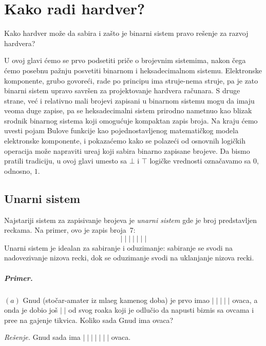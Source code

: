 \chapter{Kako radi hardver?}

Kako hardver mo\v ze da sabira i za\v sto je binarni sistem pravo re\v senje za razvoj hardvera?

U ovoj glavi \'cemo se prvo podsetiti pri\v ce o brojevnim sistemima,
nakon \v cega \'cemo posebnu pa\v znju posvetiti binarnom i heksadecimalnom sistemu.
Elektronske komponente, grubo govore\'ci, rade po principu ima struje-nema struje, pa je zato
binarni sistem upravo savr\v sen za projektovanje hardvera ra\v cunara.
S druge strane, ve\'c i relativno mali brojevi zapisani u binarnom sistemu mogu da imaju veoma duge
zapise, pa se heksadecimalni sistem prirodno nametnuo kao blizak srodnik binarnog sistema koji
omogu\'cuje kompaktan zapis broja. Na kraju \'cemo uvesti pojam Bulove funkcije kao pojednostavljenog
matemati\v ckog modela elektronske komponente, i pokaza\'cemo kako se polaze\'ci od osnovnih logi\v ckih
operacija mo\v ze napraviti ure\dj aj koji sabira binarno zapisane brojeve.
Da bismo pratili tradiciju, u ovoj glavi umesto sa $\bot$ i $\top$
logi\v cke vrednosti ozna\v cavamo sa $0$, odnosno, $1$.

\ifBIOINF
\section{Unarni sistem}

Najstariji sistem za zapisivanje brojeva je \emph{unarni sistem} gde je broj predstavljen reckama.
Na primer, ovo je zapis broja~7:
$$
  |\;|\;|\;|\;|\;|\;|
$$
Unarni sistem je idealan za sabiranje i oduzimanje: sabiranje se svodi na nadovezivanje nizova recki,
dok se oduzimanje svodi na uklanjanje nizova recki.

\paragraph{Primer.} $(a)$ Gnud (sto\v car-amater iz mla\dj eg kamenog doba)
je prvo imao $|\;|\;|\;|\;|$ ovaca, a onda je dobio jo\v s $|\;|$ od svog ro\dj aka koji je odlu\v cio da
napusti biznis sa ovcama i pre\dj e na gajenje tikvica. Koliko sada Gnud ima ovaca?

\medskip

\textit{Re\v senje.} Gnud sada ima $|\;|\;|\;|\;|\;|\;|$ ovaca.


